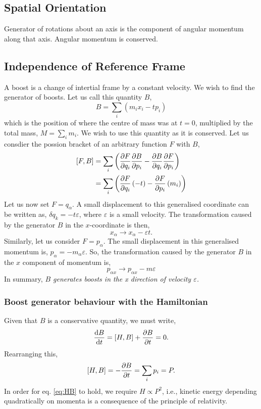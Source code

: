 \documentclass{book}
\begin{document}
\subsection{Spatial Orientation}
Generator of rotations about an axis is the component of angular momentum along that axis. Angular momentum is conserved.
\subsection{Independence of Reference Frame}
A boost is a change of intertial frame by a constant velocity. We wish to find the generator of boosts. Let us call this quantity $B$,
\begin{equation}
	\boxed{B = \sum_i\left(m_ix_i - tp_i\right)}
\end{equation}
which is the position of where the centre of mass was at $t=0$, multiplied by the total mass, $M = \sum_i m_i$. We wish to use this quantity as it is conserved. Let us consdier the possion bracket of an arbitrary function $F$ with $B$,
\begin{equation}
	\begin{split}
		\left[F,B\right] & = \sum_i\left(\pdv{F}{q_i}\pdv{B}{p_i} - \pdv{B}{q_i}\pdv{F}{p_i}\right) \\ 
		& = \sum_i\left(\pdv{F}{q_i}\left(-t\right) - \pdv{F}{p_i}\left(m_i\right)\right)
	\end{split}
\end{equation}
Let us now set $F = q_{\alpha}$. A small displacement to this generalised coordinate can be written as, $\delta q_k = -t\varepsilon$, where $\varepsilon$ is a small velocity. The transformation caused by the generator $B$ in the $x$-coordinate is then,
\begin{equation}
	x_{\alpha} \to x_{\alpha} - \varepsilon t.
\end{equation}
Similarly, let us consider $F = p_{\alpha}$. The small displacement in this generalised momentum is, $p_{\alpha} = -m_{\alpha}\varepsilon$. So, the transformation caused by the generator $B$ in the $x$ component of momentum is,
\begin{equation}
	p_{\alpha x} \to p_{\alpha x} - m\varepsilon
\end{equation}
In summary, \textit{$B$ generates boosts in the x direction of velocity $\varepsilon$.}
\subsubsection{Boost generator behaviour with the Hamiltonian}
Given that $B$ is a conservative quantity, we must write,
\begin{equation}
	\dv{B}{t} = \left[H,B\right] + \pdv{B}{t} = 0.
\end{equation}
Rearranging this,
\begin{equation}
	\left[H,B\right] = -\pdv{B}{t} = \sum_ip_i = P. \label{eq:HB}
\end{equation}
In order for eq. \eqref{eq:HB} to hold, we require $H \propto P^2$, i.e., kinetic energy depending quadratically on momenta is a consequence of the principle of relativity.
\end{document}
